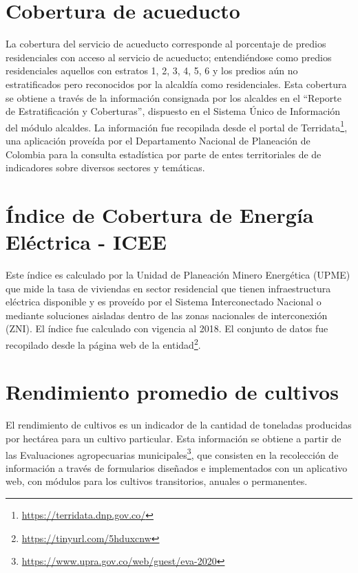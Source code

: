 \label{sec:fuentes}

\section{Cobertura de acueducto}
La cobertura del servicio de acueducto corresponde al porcentaje de predios residenciales con acceso al servicio de acueducto; entendiéndose como predios 
residenciales aquellos con estratos 1, 2, 3, 4, 5, 6 y los predios aún no estratificados pero reconocidos por la alcaldía como residenciales. Esta cobertura se 
obtiene a través de la información consignada por los alcaldes en el ``Reporte de Estratificación y Coberturas'', dispuesto en el Sistema Único de Información 
del módulo alcaldes.  La información fue recopilada desde el portal de Terridata\footnote{\url{https://terridata.dnp.gov.co/}}, una 
aplicación proveída por el Departamento Nacional de Planeación de Colombia para la consulta estadística por parte de entes territoriales de de indicadores
sobre diversos sectores y temáticas.

\section{Índice de Cobertura de Energía Eléctrica - ICEE}

Este índice es calculado por la Unidad de Planeación Minero Energética (UPME) que mide la tasa de viviendas en sector residencial que tienen infraestructura 
eléctrica disponible y es proveído por el Sistema Interconectado Nacional o mediante soluciones aisladas dentro de las zonas nacionales de interconexión (ZNI).
 El índice fue calculado con vigencia al 2018.  El conjunto de datos fue recopilado desde la página web de la 
entidad\footnote{\url{https://tinyurl.com/5hduxcnw}}.

\section{Rendimiento promedio de cultivos}

El rendimiento de cultivos es un indicador de la cantidad de toneladas producidas por hectárea para un cultivo particular. Esta información se obtiene a partir 
de las Evaluaciones agropecuarias municipales\footnote{\url{https://www.upra.gov.co/web/guest/eva-2020}}, que consisten en la recolección de información a 
través de formularios diseñados e implementados con un aplicativo web, con módulos para los cultivos transitorios, anuales o permanentes. 


